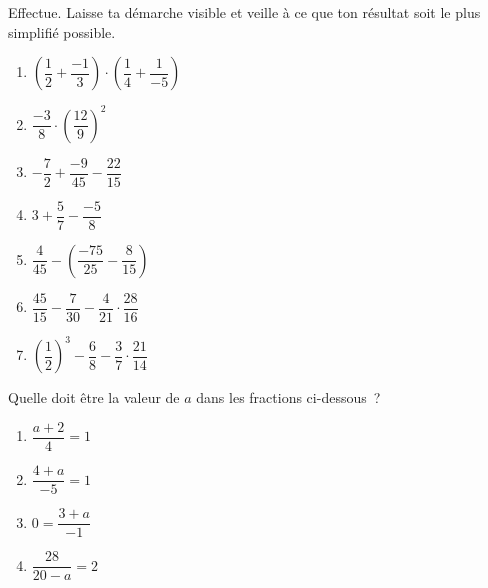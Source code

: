 \documentclass[../../syllabus_2.tex]{subfiles}
\begin{document}
%

\setcounter{exercise}{0}
\begin{exercise}
  Effectue. Laisse ta démarche visible et veille à ce que ton résultat soit le plus simplifié possible.
  \begin{enumerate}[cols=2]
    \item $\left(\dfrac{1}{2}+\dfrac{-1}{3}\right) \cdot \left(\dfrac{1}{4}+\dfrac{1}{-5}\right)$
    \item $\dfrac{-3}{8}\cdot \left(\dfrac{12}{9}\right)^2$
    \item $-\dfrac{7}{2}+\dfrac{-9}{45} - \dfrac{22}{15}$
    \item $3+\dfrac{5}{7} - \dfrac{-5}{8}$
    \item $\dfrac{4}{45}-\left(\dfrac{-75}{25} - \dfrac{8}{15}\right)$
    \item $\dfrac{45}{15}-\dfrac{7}{30} - \dfrac{4}{21}\cdot \dfrac{28}{16}$
    \item $\left(\dfrac{1}{2}\right)^3 - \dfrac{6}{8} - \dfrac{3}{7} \cdot \dfrac{21}{14}$
  \end{enumerate}
\end{exercise}


\begin{exercise}
  Quelle doit être la valeur de \(a\) dans les fractions ci-dessous~?
  \begin{enumerate}[cols=2]
    \item $\dfrac{a+2}{4}=1$
    \item $\dfrac{4+a}{-5}=1$
    \item $0=\dfrac{3+a}{-1}$
    \item $\dfrac{28}{20-a}=2$
  \end{enumerate}
\end{exercise}
\end{document}

